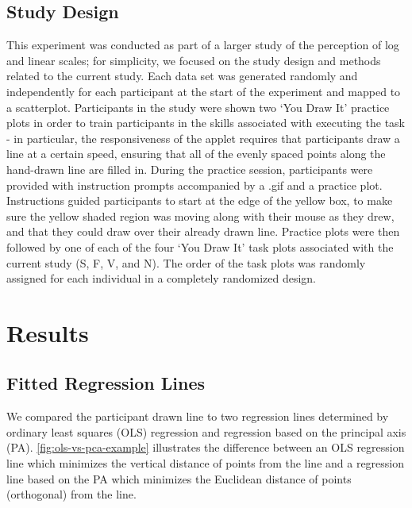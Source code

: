 \documentclass[12pt]{article}
\begin{document}
\hypertarget{study-design}{%
\subsection{Study Design}\label{study-design}}

This experiment was conducted as part of a larger study of the
perception of log and linear scales; for simplicity, we focused on the
study design and methods related to the current study. Each data set was
generated randomly and independently for each participant at the start
of the experiment and mapped to a scatterplot. Participants in the study
were shown two `You Draw It' practice plots in order to train
participants in the skills associated with executing the task - in
particular, the responsiveness of the applet requires that participants
draw a line at a certain speed, ensuring that all of the evenly spaced
points along the hand-drawn line are filled in. During the practice
session, participants were provided with instruction prompts accompanied
by a .gif and a practice plot. Instructions guided participants to start
at the edge of the yellow box, to make sure the yellow shaded region was
moving along with their mouse as they drew, and that they could draw
over their already drawn line. Practice plots were then followed by one
of each of the four `You Draw It' task plots associated with the current
study (S, F, V, and N). The order of the task plots was randomly
assigned for each individual in a completely randomized design.

\hypertarget{results}{%
\section{Results}\label{results}}

\hypertarget{fitted-regression-lines}{%
\subsection{Fitted Regression Lines}\label{fitted-regression-lines}}

We compared the participant drawn line to two regression lines
determined by ordinary least squares (OLS) regression and regression
based on the principal axis (PA). \cref{fig:ols-vs-pca-example}
illustrates the difference between an OLS regression line which
minimizes the vertical distance of points from the line and a regression
line based on the PA which minimizes the Euclidean distance of points
(orthogonal) from the line.
\end{document}
